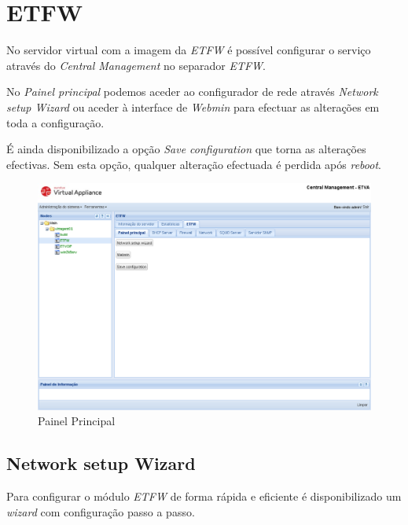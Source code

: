 \section{ETFW}

No servidor virtual com a imagem da \textit{ETFW} é possível configurar o serviço através do \textit{Central Management} no separador \textit{ETFW}.

No \textit{Painel principal} podemos aceder ao configurador de rede através \textit{Network setup Wizard} ou aceder à interface de \textit{Webmin} para efectuar as alterações em toda a configuração.

É ainda disponibilizado a opção \textit{Save configuration} que torna as alterações efectivas. Sem esta opção, qualquer alteração efectuada é perdida após \textit{reboot}.

\begin{figure}[H]
    \begin{center}
    \includegraphics[scale=0.38]{screenshots/etfw/etfwmain.png}
    \caption{Painel Principal}
    \label{fig:etfwmain}
    \end{center}
\end{figure}

\subsection{Network setup Wizard}

Para configurar o módulo \textit{ETFW} de forma rápida e eficiente é disponibilizado um \textit{wizard} com configuração passo a passo.

